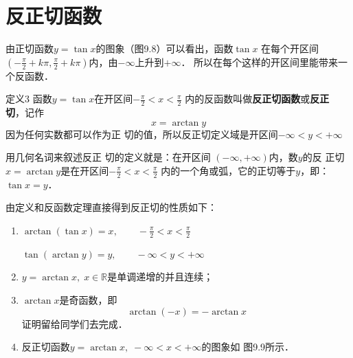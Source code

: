\section{反正切函数}

由正切函数$y=\tan x$的图象（图9.8）可以看出，函数$\tan x$
在每个开区间$\left(-\frac{\pi}{2}+k\pi, \frac{\pi}{2}+k\pi\right)$内，由$-\infty$上升到$+\infty$．
所以在每个这样的开区间里能带来一个反函数．


\begin{figure}[htp]
    \centering
{}
    \caption{}

\end{figure}



\begin{blk}{定义3}
    函数$y=\tan x$在开区间$-\frac{\pi}{2}<x<\frac{\pi}{2}$
内的反函数叫做\textbf{反正切函数}或\textbf{反正
切}，记作
\[x=\arctan y\]
因为任何实数都可以作为正
切的值，所以反正切定义域是开区间$-\infty<y<+\infty$
\end{blk}

用几何名词来叙述反正
切的定义就是：在开区间
$(-\infty, +\infty)$内，数$y$的反
正切$x=\arctan y$是在开区间$-\frac{\pi}{2}<x<\frac{\pi}{2}$
内的一个角或弧，它的正切等于$y$，即：$\tan x=y$．

由定义和反函数定理直接得到反正切的性质如下：
\begin{enumerate}
    \item $\arctan (\tan x)=x, \qquad -\frac{\pi}{2}<x<\frac{\pi}{2}$
    
    $\tan (\arctan y)=y,\qquad -\infty<y<+\infty$
    \item $y=\arctan x,\; x\in\mathbb{R}$是单调递增的并且连续；
    \item $\arctan x$是奇函数，即
    \[\arctan (-x)=-\arctan x\]
    证明留给同学们去完成．
    \item 反正切函数$y=\arctan x,\; -\infty<x<+\infty$的图象如
    图9.9所示．
\end{enumerate}


